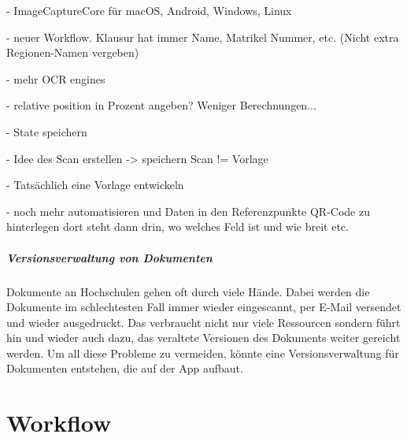 \documentclass[nomenclature, oneside, 150]{HSMW-Thesis}
\begin{document}
	- ImageCaptureCore für macOS, Android, Windows, Linux
	
	- neuer Workflow. Klausur hat immer Name, Matrikel Nummer, etc. (Nicht extra Regionen-Namen vergeben)
	
	- mehr OCR engines
	
	- relative position in Prozent angeben? Weniger Berechnungen...
	
	- State speichern
	
	- Idee des Scan erstellen -> speichern Scan != Vorlage
	
	- Tatsächlich eine Vorlage entwickeln
	
	- noch mehr automatisieren und Daten in den Referenzpunkte QR-Code zu hinterlegen dort steht dann drin, wo welches Feld ist und wie breit etc. 
	
	\paragraph{Versionsverwaltung von Dokumenten} Dokumente an Hochschulen gehen oft durch viele Hände. Dabei werden die Dokumente im schlechtesten Fall immer wieder eingescannt, per E-Mail versendet und wieder ausgedruckt. Das verbraucht nicht nur viele Ressourcen sondern führt hin und wieder auch dazu, das veraltete Versionen des Dokuments weiter gereicht werden. Um all diese Probleme zu vermeiden, könnte eine Versionsverwaltung für Dokumenten entstehen, die auf der App aufbaut. 

\Anhang

\chapter{Workflow} \label{ch:workflow}
\end{document}
